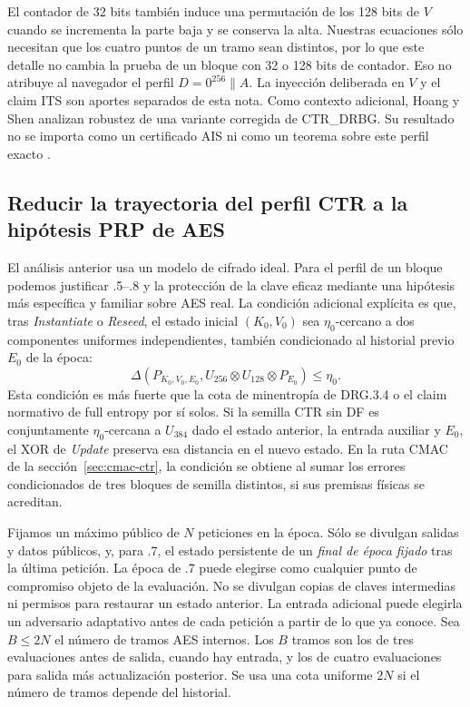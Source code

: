\documentclass[11pt,a4paper]{article}
\newcommand{\dist}{\Delta}
\begin{document}
El contador de 32 bits también induce una permutación
de los 128 bits de \(V\) cuando se incrementa la parte
baja y se conserva la alta. Nuestras ecuaciones
sólo necesitan que los cuatro puntos de un tramo
sean distintos, por lo que este detalle no cambia
la prueba de un bloque con 32 o 128 bits de contador.
Eso no atribuye al navegador el perfil
\(D=0^{256}\|A\). La inyección deliberada en \(V\) y
el claim ITS son aportes separados de esta nota.
Como contexto adicional, Hoang y Shen analizan
robustez de una variante corregida de CTR\_DRBG.
Su resultado no se importa como un certificado
AIS ni como un teorema sobre este perfil exacto
\cite[§4.2.4.1]{bsi-browsers}\cite{hoang-shen}.

\subsection{Reducir la trayectoria del perfil CTR a la hipótesis PRP de AES}
\label{sec:ctr-prp}

El análisis anterior usa un modelo de cifrado ideal.
Para el perfil de un bloque podemos justificar .5--.8
y la protección de la clave eficaz mediante una
hipótesis más específica y familiar sobre AES
real. La condición adicional explícita es que,
tras \emph{Instantiate} o \emph{Reseed}, el
estado inicial \((K_0,V_0)\) sea
\(\eta_0\)-cercano a dos componentes uniformes
independientes, también condicionado al
historial previo \(E_0\) de la época:
\begin{equation}
 \dist(P_{K_0,V_0,E_0},U_{256}\otimes U_{128}\otimes P_{E_0})
 \le \eta_0.
 \label{eq:ctr-seed-closeness}
\end{equation}
Esta condición es más fuerte que la cota de
minentropía de DRG.3.4 o el claim normativo de
full entropy por sí solos. Si la semilla CTR
sin DF es conjuntamente \(\eta_0\)-cercana a
\(U_{384}\) dado el estado anterior, la entrada
auxiliar y \(E_0\), el XOR de
\emph{Update} preserva esa distancia en el
nuevo estado. En la ruta CMAC de
la sección~\ref{sec:cmac-ctr}, la condición
se obtiene al sumar los errores condicionados
de tres bloques de semilla distintos, si sus
premisas físicas se acreditan.

Fijamos un máximo público de \(N\) peticiones
en la época. Sólo se divulgan salidas y
datos públicos, y, para .7, el estado
persistente de un \emph{final de época fijado}
tras la última petición. La época de .7
puede elegirse como cualquier punto de
compromiso objeto de la evaluación.
No se divulgan copias de claves intermedias
ni permisos para restaurar un estado
anterior. La entrada adicional puede elegirla
un adversario adaptativo antes de cada
petición a partir de lo que ya conoce.
Sea \(B\le2N\) el número de tramos AES
internos. Los \(B\) tramos son los de tres
evaluaciones antes de salida, cuando hay
entrada, y los de cuatro evaluaciones para
salida más actualización posterior. Se usa
una cota uniforme \(2N\) si el número de
tramos depende del historial.
\end{document}
